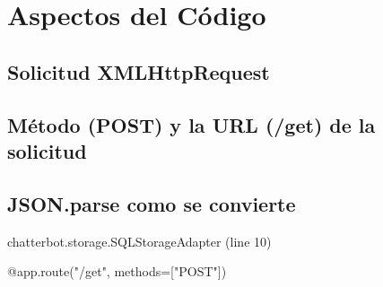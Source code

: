 \documentclass[a4paper,12pt]{article}
\begin{document}
\section{Aspectos del Código}

\subsection{Solicitud XMLHttpRequest}
\subsection{Método (POST) y la URL (/get) de la solicitud}
\subsection{JSON.parse como se convierte }


chatterbot.storage.SQLStorageAdapter (line 10)


@app.route("/get", methods=["POST"])





\newpage %
\thispagestyle{fancyref}
\printbibliography %
\end{document}
